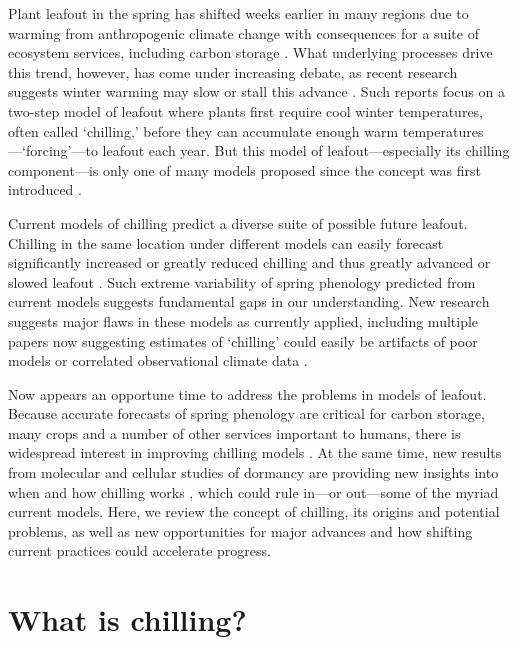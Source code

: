 \documentclass[11pt]{article}
\begin{document}
Plant leafout in the spring has shifted weeks earlier in many regions due to warming from anthropogenic climate change with consequences for a suite of ecosystem services, including carbon storage \citep{keenan2014net,ipcc2022}.  What underlying processes drive this trend, however, has come under increasing debate, as recent research suggests winter warming may slow or stall this advance \citep{fu2015,piao2017}. Such reports focus on a two-step model of leafout where plants first require cool winter temperatures, often called `chilling,' before they can accumulate enough warm temperatures---`forcing'---to leafout each year. But this model of leafout---especially its chilling component---is only one of many models proposed since the concept was first introduced \citep[][]{basler2016evaluating,hufkens2018integrated}. 

Current models of chilling predict a diverse suite of possible future leafout. Chilling in the same location under different models can easily forecast significantly increased or greatly reduced chilling and thus greatly advanced or slowed leafout \citep{guy2014,chuine2016}. Such extreme variability of spring phenology predicted from current models suggests fundamental gaps in our understanding. New research suggests major flaws in these models as currently applied, including multiple papers now suggesting estimates of `chilling' could easily be artifacts of poor models or correlated observational climate data \citep{decsens,gao2024}. 

Now appears an opportune time to address the problems in models of leafout. Because accurate forecasts of spring phenology are critical for carbon storage, many crops and a number of other services important to humans, there is widespread interest in improving chilling models \citep{Luedeling2015Acta,chuine2016}. At the same time, new results from molecular and cellular studies of dormancy are providing new insights into when and how chilling works \citep{pan2023epigenetic,zhu2021cold}, which could rule in---or out---some of the myriad current models. 
Here, we review the concept of chilling, its origins and potential problems, as well as new opportunities for major advances and how shifting current practices could accelerate progress. %

\section*{What is chilling?}
\end{document}
